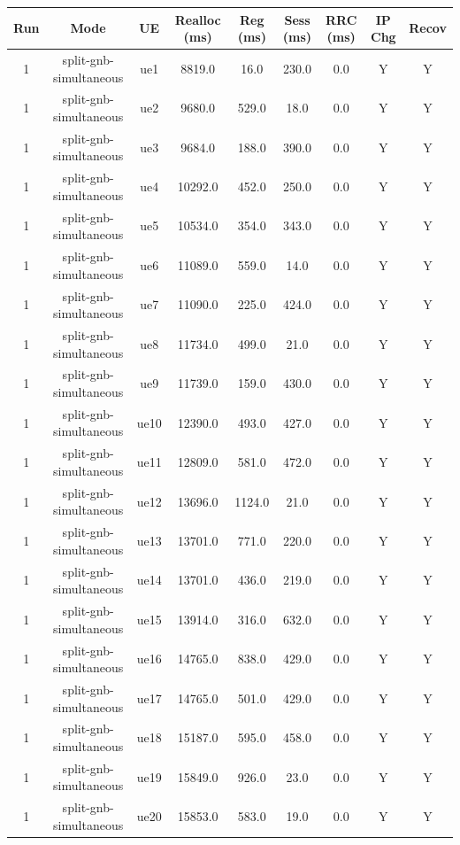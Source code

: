 \begin{table}[ht]
\centering
\begin{tabular}{|c|c|c|c|c|c|c|c|c|}
\hline
Run & Mode & UE & Realloc (ms) & Reg (ms) & Sess (ms) & RRC (ms) & IP Chg & Recov \\
\hline
1 & split-gnb-simultaneous & ue1 & 8819.0 & 16.0 & 230.0 & 0.0 & Y & Y \\
1 & split-gnb-simultaneous & ue2 & 9680.0 & 529.0 & 18.0 & 0.0 & Y & Y \\
1 & split-gnb-simultaneous & ue3 & 9684.0 & 188.0 & 390.0 & 0.0 & Y & Y \\
1 & split-gnb-simultaneous & ue4 & 10292.0 & 452.0 & 250.0 & 0.0 & Y & Y \\
1 & split-gnb-simultaneous & ue5 & 10534.0 & 354.0 & 343.0 & 0.0 & Y & Y \\
1 & split-gnb-simultaneous & ue6 & 11089.0 & 559.0 & 14.0 & 0.0 & Y & Y \\
1 & split-gnb-simultaneous & ue7 & 11090.0 & 225.0 & 424.0 & 0.0 & Y & Y \\
1 & split-gnb-simultaneous & ue8 & 11734.0 & 499.0 & 21.0 & 0.0 & Y & Y \\
1 & split-gnb-simultaneous & ue9 & 11739.0 & 159.0 & 430.0 & 0.0 & Y & Y \\
1 & split-gnb-simultaneous & ue10 & 12390.0 & 493.0 & 427.0 & 0.0 & Y & Y \\
1 & split-gnb-simultaneous & ue11 & 12809.0 & 581.0 & 472.0 & 0.0 & Y & Y \\
1 & split-gnb-simultaneous & ue12 & 13696.0 & 1124.0 & 21.0 & 0.0 & Y & Y \\
1 & split-gnb-simultaneous & ue13 & 13701.0 & 771.0 & 220.0 & 0.0 & Y & Y \\
1 & split-gnb-simultaneous & ue14 & 13701.0 & 436.0 & 219.0 & 0.0 & Y & Y \\
1 & split-gnb-simultaneous & ue15 & 13914.0 & 316.0 & 632.0 & 0.0 & Y & Y \\
1 & split-gnb-simultaneous & ue16 & 14765.0 & 838.0 & 429.0 & 0.0 & Y & Y \\
1 & split-gnb-simultaneous & ue17 & 14765.0 & 501.0 & 429.0 & 0.0 & Y & Y \\
1 & split-gnb-simultaneous & ue18 & 15187.0 & 595.0 & 458.0 & 0.0 & Y & Y \\
1 & split-gnb-simultaneous & ue19 & 15849.0 & 926.0 & 23.0 & 0.0 & Y & Y \\
1 & split-gnb-simultaneous & ue20 & 15853.0 & 583.0 & 19.0 & 0.0 & Y & Y \\

\end{tabular}
\end{table}
